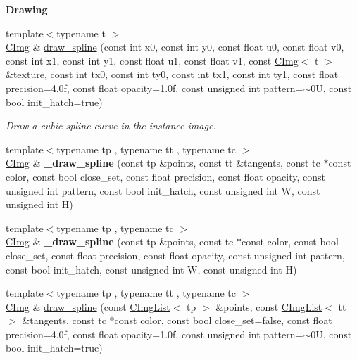 \begin{Indent}{\bf Drawing}
\begin{DoxyCompactItemize}
\item 
{\footnotesize template$<$typename t $>$ }\\\hyperlink{structcimg__library_1_1_c_img}{C\-Img} \& \hyperlink{structcimg__library_1_1_c_img_ab067f82fd32fefc69405e8907417592a}{draw\-\_\-spline} (const int x0, const int y0, const float u0, const float v0, const int x1, const int y1, const float u1, const float v1, const \hyperlink{structcimg__library_1_1_c_img}{C\-Img}$<$ t $>$ \&texture, const int tx0, const int ty0, const int tx1, const int ty1, const float precision=4.\-0f, const float opacity=1.\-0f, const unsigned int pattern=$\sim$0\-U, const bool init\-\_\-hatch=true)
\begin{DoxyCompactList}\small\item\em Draw a cubic spline curve in the instance image. \end{DoxyCompactList}\item 
\hypertarget{structcimg__library_1_1_c_img_aac7ba2f1523526177fe416ecf2c70bd5}{{\footnotesize template$<$typename tp , typename tt , typename tc $>$ }\\\hyperlink{structcimg__library_1_1_c_img}{C\-Img} \& {\bfseries \-\_\-draw\-\_\-spline} (const tp \&points, const tt \&tangents, const tc $\ast$const color, const bool close\-\_\-set, const float precision, const float opacity, const unsigned int pattern, const bool init\-\_\-hatch, const unsigned int W, const unsigned int H)}\label{structcimg__library_1_1_c_img_aac7ba2f1523526177fe416ecf2c70bd5}

\item 
\hypertarget{structcimg__library_1_1_c_img_a01d6410b1b75fa13a617a4bddb88256d}{{\footnotesize template$<$typename tp , typename tc $>$ }\\\hyperlink{structcimg__library_1_1_c_img}{C\-Img} \& {\bfseries \-\_\-draw\-\_\-spline} (const tp \&points, const tc $\ast$const color, const bool close\-\_\-set, const float precision, const float opacity, const unsigned int pattern, const bool init\-\_\-hatch, const unsigned int W, const unsigned int H)}\label{structcimg__library_1_1_c_img_a01d6410b1b75fa13a617a4bddb88256d}

\item 
\hypertarget{structcimg__library_1_1_c_img_ab478f59b2f73585d3d5a2c692c029730}{{\footnotesize template$<$typename tp , typename tt , typename tc $>$ }\\\hyperlink{structcimg__library_1_1_c_img}{C\-Img} \& \hyperlink{structcimg__library_1_1_c_img_ab478f59b2f73585d3d5a2c692c029730}{draw\-\_\-spline} (const \hyperlink{structcimg__library_1_1_c_img_list}{C\-Img\-List}$<$ tp $>$ \&points, const \hyperlink{structcimg__library_1_1_c_img_list}{C\-Img\-List}$<$ tt $>$ \&tangents, const tc $\ast$const color, const bool close\-\_\-set=false, const float precision=4.\-0f, const float opacity=1.\-0f, const unsigned int pattern=$\sim$0\-U, const bool init\-\_\-hatch=true)}\label{structcimg__library_1_1_c_img_ab478f59b2f73585d3d5a2c692c029730}


\end{DoxyCompactItemize}
\end{Indent}
